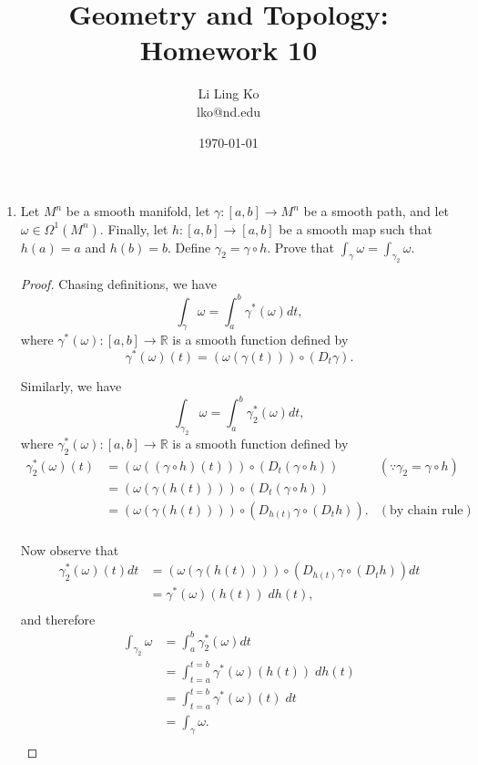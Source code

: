 \documentclass{article}
\begin{document}
\title{Geometry and Topology: Homework 10}
\author{Li Ling Ko\\ lko@nd.edu}
\date{\today}
\maketitle

\begin{enumerate}[label={\bf Q\arabic*:}]
  \item Let $M^n$ be a smooth manifold, let $\gamma:[a,b]\rightarrow M^n$
    be a smooth path, and let $\omega\in\Omega^1(M^n)$. Finally, let
    $h:[a,b]\rightarrow[a,b]$ be a smooth map such that $h(a)=a$ and
    $h(b)=b$. Define $\gamma_2=\gamma\circ h$. Prove that
    $\int_{\gamma}\omega=\int_{\gamma_2}\omega$.

    \begin{proof}
      Chasing definitions, we have
      \[\int_\gamma\omega =\int_a^b\gamma^*(\omega)dt,\]
      where $\gamma^*(\omega):[a,b]\rightarrow\mathbb{R}$ is a smooth
      function defined by
      \[\gamma^*(\omega)(t) =(\omega(\gamma(t)))\circ(D_t\gamma).\]

      Similarly, we have
      \[\int_{\gamma_2}\omega =\int_a^b\gamma_2^*(\omega)dt,\]
      where $\gamma_2^*(\omega):[a,b]\rightarrow\mathbb{R}$ is a smooth
      function defined by
      \begin{align*}
        \gamma_2^*(\omega)(t) &=(\omega((\gamma\circ h)(t)))
          \circ(D_t(\gamma\circ h)) &(\because\gamma_2=\gamma\circ h) \\
          &=(\omega(\gamma(h(t)))) \circ(D_t(\gamma\circ h)) \\
          &=(\omega(\gamma(h(t)))) \circ(D_{h(t)}\gamma\circ(D_th)).
            &(\text{by chain rule}) \\
      \end{align*}

      Now observe that
      \begin{align*}
        \gamma_2^*(\omega)(t)dt &=(\omega(\gamma(h(t))))
          \circ(D_{h(t)}\gamma\circ(D_th)) dt \\
          &=\gamma^*(\omega)(h(t))\; dh(t), \\
      \end{align*}
      and therefore
      \begin{align*}
        \int_{\gamma_2}\omega &=\int_a^b\gamma_2^*(\omega)dt \\
          &=\int^{t=b}_{t=a}\gamma^*(\omega)(h(t))\; dh(t) \\
          &=\int^{t=b}_{t=a}\gamma^*(\omega)(t)\; dt \\
          &=\int_{\gamma}\omega. \\
      \end{align*}
    \end{proof}
\end{enumerate}
\end{document}
